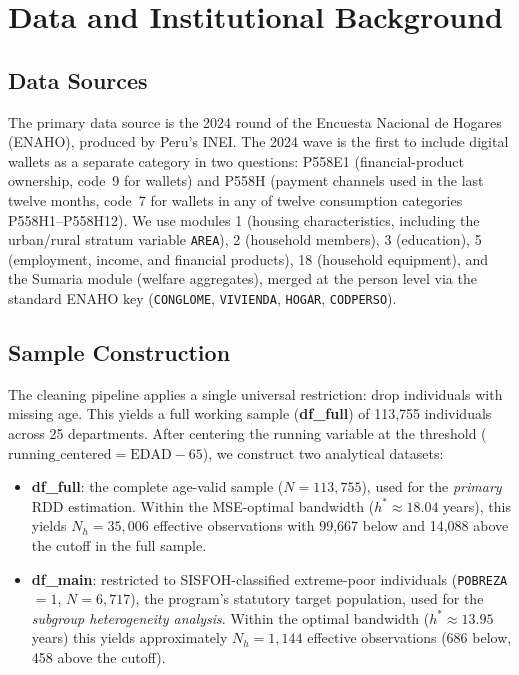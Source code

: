 \documentclass[12pt]{article}
\begin{document}
\section{Data and Institutional Background}
\label{sec:data}

\subsection{Data Sources}

The primary data source is the 2024 round of the Encuesta Nacional de
Hogares (ENAHO), produced by Peru's INEI. The 2024 wave is the first to
include digital wallets as a separate category in two questions: P558E1
(financial-product ownership, code~9 for wallets) and P558H (payment
channels used in the last twelve months, code~7 for wallets in any of
twelve consumption categories P558H1--P558H12). We use modules 1 (housing
characteristics, including the urban/rural stratum variable \texttt{AREA}),
2 (household members), 3 (education), 5 (employment, income, and financial
products), 18 (household equipment), and the Sumaria module (welfare
aggregates), merged at the person level via the standard ENAHO key
(\texttt{CONGLOME}, \texttt{VIVIENDA}, \texttt{HOGAR}, \texttt{CODPERSO}).

\subsection{Sample Construction}

The cleaning pipeline applies a single universal restriction: drop
individuals with missing age. This yields a full working sample
(\textbf{df\_full}) of 113,755 individuals across 25 departments. After
centering the running variable at the threshold ($\text{running\_centered} =
\text{EDAD} - 65$), we construct two analytical datasets:

\begin{itemize}
    \item \textbf{df\_full}: the complete age-valid sample ($N=113{,}755$),
    used for the \emph{primary} RDD estimation. Within the MSE-optimal
    bandwidth ($h^{*}\!\approx\!18.04$ years), this yields $N_h\!=\!35{,}006$
    effective observations with 99,667 below and 14,088 above the cutoff in
    the full sample.
    \item \textbf{df\_main}: restricted to SISFOH-classified extreme-poor
    individuals (\texttt{POBREZA}$=1$, $N=6{,}717$), the program's statutory
    target population, used for the \emph{subgroup heterogeneity analysis}.
    Within the optimal bandwidth ($h^{*}\!\approx\!13.95$ years) this yields
    approximately $N_h\!=\!1{,}144$ effective observations (686 below, 458
    above the cutoff).
\end{itemize}
\end{document}
